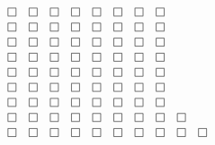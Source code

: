 \documentclass{article}
\begin{document}
\begin{doublespace}
\noindent\(\begin{array}{cccccccccc}
 \fbox{$$} & \fbox{$$} & \fbox{$$} & \fbox{$$} & \fbox{$$} & \fbox{$$} & \fbox{$$} & \fbox{$$} & \text{} & \text{} \\
 \fbox{$$} & \fbox{$$} & \fbox{$$} & \fbox{$$} & \fbox{$$} & \fbox{$$} & \fbox{$$} & \fbox{$$} & \text{} & \text{} \\
 \fbox{$$} & \fbox{$$} & \fbox{$$} & \fbox{$$} & \fbox{$$} & \fbox{$$} & \fbox{$$} & \fbox{$$} & \text{} & \text{} \\
 \fbox{$$} & \fbox{$$} & \fbox{$$} & \fbox{$$} & \fbox{$$} & \fbox{$$} & \fbox{$$} & \fbox{$$} & \text{} & \text{} \\
 \fbox{$$} & \fbox{$$} & \fbox{$$} & \fbox{$$} & \fbox{$$} & \fbox{$$} & \fbox{$$} & \fbox{$$} & \text{} & \text{} \\
 \fbox{$$} & \fbox{$$} & \fbox{$$} & \fbox{$$} & \fbox{$$} & \fbox{$$} & \fbox{$$} & \fbox{$$} & \text{} & \text{} \\
 \fbox{$$} & \fbox{$$} & \fbox{$$} & \fbox{$$} & \fbox{$$} & \fbox{$$} & \fbox{$$} & \fbox{$$} & \text{} & \text{} \\
 \fbox{$$} & \fbox{$$} & \fbox{$$} & \fbox{$$} & \fbox{$$} & \fbox{$$} & \fbox{$$} & \fbox{$$} & \fbox{$$} & \text{} \\
 \fbox{$$} & \fbox{$$} & \fbox{$$} & \fbox{$$} & \fbox{$$} & \fbox{$$} & \fbox{$$} & \fbox{$$} & \fbox{$$} & \fbox{$$} \\
\end{array}\)
\end{doublespace}
\end{document}
